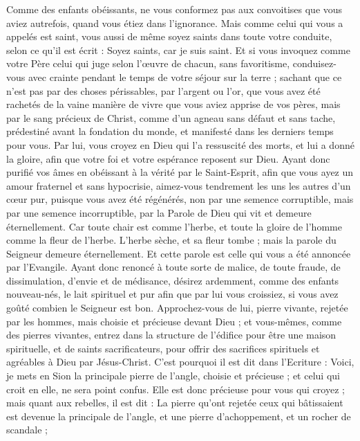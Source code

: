 \begin{multicols}{2}
Comme des enfants obéissants, ne vous conformez pas aux convoitises que vous aviez autrefois, quand vous étiez dans l’ignorance.
Mais comme celui qui vous a appelés est saint, vous aussi de même soyez saints dans toute votre conduite,
selon ce qu'il est écrit : Soyez saints, car je suis saint{}.
Et si vous invoquez comme votre Père celui qui juge selon l’œuvre de chacun, sans favoritisme, conduisez-vous avec crainte pendant le temps de votre séjour sur la terre ;
sachant que ce n’est pas par des choses périssables, par l’argent ou l’or, que vous avez été rachetés de la vaine manière de vivre que vous aviez apprise de vos pères,
mais par le sang précieux de Christ, comme d’un agneau sans défaut et sans tache,
prédestiné avant la fondation du monde, et manifesté dans les derniers temps pour vous.
Par lui, vous croyez en Dieu qui l'a ressuscité des morts, et lui a donné la gloire, afin que votre foi et votre espérance reposent sur Dieu.
Ayant donc purifié vos âmes en obéissant à la vérité par le Saint-Esprit, afin que vous ayez un amour fraternel et sans hypocrisie, aimez-vous tendrement les uns les autres d'un cœur pur,
puisque vous avez été régénérés, non par une semence corruptible, mais par une semence incorruptible, par la Parole de Dieu qui vit et demeure éternellement.
Car toute chair est comme l'herbe, et toute la gloire de l'homme comme la fleur de l'herbe. L'herbe sèche, et sa fleur tombe ;
mais la parole du Seigneur demeure éternellement{}. Et cette parole est celle qui vous a été annoncée par l’Evangile.
\VerseOne{}Ayant donc renoncé à toute sorte de malice, de toute fraude, de dissimulation, d'envie et de médisance,
désirez ardemment, comme des enfants nouveau-nés, le lait spirituel et pur afin que par lui vous croissiez,
si vous avez goûté combien le Seigneur est bon.
Approchez-vous de lui, pierre vivante, rejetée par les hommes, mais choisie et précieuse devant Dieu ;
et vous-mêmes, comme des pierres vivantes, entrez dans la structure de l’édifice pour être une maison spirituelle, et de saints sacrificateurs, pour offrir des sacrifices spirituels et agréables à Dieu par Jésus-Christ.
C'est pourquoi il est dit dans l'Ecriture : Voici, je mets en Sion la principale pierre{} de l’angle, choisie et précieuse ; et celui qui croit en elle, ne sera point confus.
Elle est donc précieuse pour vous qui croyez ; mais quant aux rebelles, il est dit : La pierre qu’ont rejetée ceux qui bâtissaient est devenue la principale de l’angle, et une pierre d'achoppement, et un rocher de scandale ;

\end{multicols}
